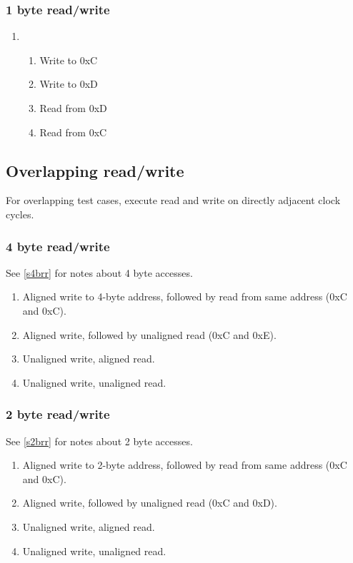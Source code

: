 \documentclass{scrartcl}
\begin{document}
\subsubsection{1 byte read/write}
\begin{enumerate}
    \item
    \begin{enumerate}
        \item Write to 0xC
        \item Write to 0xD
        \item Read from 0xD
        \item Read from 0xC
    \end{enumerate}
\end{enumerate}

\subsection{Overlapping read/write}
For overlapping test cases, execute read and write on directly adjacent clock cycles.

\subsubsection{4 byte read/write}
See \autoref{s4brr} for notes about 4 byte accesses.
\begin{enumerate}
    \item Aligned write to 4-byte address, followed by read from same address (0xC and 0xC).
    \item Aligned write, followed by unaligned read (0xC and 0xE).
    \item Unaligned write, aligned read.
    \item Unaligned write, unaligned read.
\end{enumerate}

\subsubsection{2 byte read/write}
See \autoref{s2brr} for notes about 2 byte accesses.
\begin{enumerate}
    \item Aligned write to 2-byte address, followed by read from same address (0xC and 0xC).
    \item Aligned write, followed by unaligned read (0xC and 0xD).
    \item Unaligned write, aligned read.
    \item Unaligned write, unaligned read.
\end{enumerate}
\end{document}

